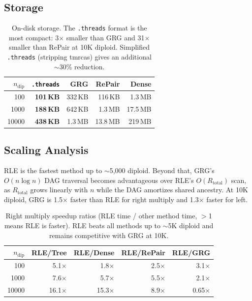 \documentclass[11pt]{article}
\begin{document}
\subsection{Storage}

\begin{table}[h]
\centering
\begin{tabular}{r rrrr}
\toprule
$n_\text{dip}$ & \texttt{.threads} & GRG & RePair & Dense \\
\midrule
100   & \textbf{101\,KB}  & 332\,KB  & 116\,KB  & 1.3\,MB \\
1000  & \textbf{188\,KB}  & 642\,KB  & 1.3\,MB  & 17.5\,MB \\
10000 & \textbf{438\,KB}  & 1.3\,MB  & 13.8\,MB & 219\,MB \\
\bottomrule
\end{tabular}
\caption{On-disk storage. The \texttt{.threads} format is the most compact:
3$\times$ smaller than GRG and 31$\times$ smaller than RePair at 10K
diploid. Simplified \texttt{.threads} (stripping tmrcas) gives an
additional $\sim$30\% reduction.}
\label{tab:size}
\end{table}

\subsection{Scaling Analysis}

RLE is the fastest method up to $\sim$5{,}000 diploid.  Beyond that, GRG's
$O(n\log n)$ DAG traversal becomes advantageous over RLE's $O(R_\text{total})$
scan, as $R_\text{total}$ grows linearly with $n$ while the DAG amortizes
shared ancestry.  At 10K diploid, GRG is 1.5$\times$ faster than RLE for
right multiply and 1.3$\times$ faster for left.

\begin{table}[h]
\centering
\begin{tabular}{r rrrr}
\toprule
$n_\text{dip}$ & RLE/Tree & RLE/Dense & RLE/RePair & RLE/GRG \\
\midrule
100   & 5.1$\times$ & 1.8$\times$ & 2.5$\times$ & 3.1$\times$ \\
1000  & 7.6$\times$ & 5.7$\times$ & 5.5$\times$ & 2.1$\times$ \\
10000 & 16.1$\times$ & 15.3$\times$ & 8.9$\times$ & 0.65$\times$ \\
\bottomrule
\end{tabular}
\caption{Right multiply speedup ratios (RLE time / other method time,
$>$1 means RLE is faster).  RLE beats all methods up to $\sim$5K diploid
and remains competitive with GRG at 10K.}
\label{tab:speedup}
\end{table}
\end{document}
